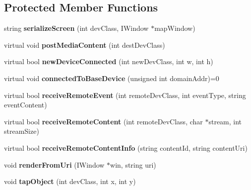 \subsection*{Protected Member Functions}
\begin{CompactItemize}
\item 
string \textbf{serializeScreen} (int devClass, IWindow $\ast$mapWindow)\label{classbr_1_1pucrio_1_1telemidia_1_1ginga_1_1ncl_1_1multidevice_1_1FormatterMultiDevice_f5e47dbd0c86806c7b1304fa042bfeb0}

\item 
virtual void \textbf{postMediaContent} (int destDevClass)\label{classbr_1_1pucrio_1_1telemidia_1_1ginga_1_1ncl_1_1multidevice_1_1FormatterMultiDevice_8125c94ad28c93f049b8cacdccc6d3c9}

\item 
virtual bool \textbf{newDeviceConnected} (int newDevClass, int w, int h)\label{classbr_1_1pucrio_1_1telemidia_1_1ginga_1_1ncl_1_1multidevice_1_1FormatterMultiDevice_fbbd269b1e949d8a04152b1e9106e1d7}

\item 
virtual void \textbf{connectedToBaseDevice} (unsigned int domainAddr)=0\label{classbr_1_1pucrio_1_1telemidia_1_1ginga_1_1ncl_1_1multidevice_1_1FormatterMultiDevice_3af5d97a0c56f9da9a45172453022837}

\item 
virtual bool \textbf{receiveRemoteEvent} (int remoteDevClass, int eventType, string eventContent)\label{classbr_1_1pucrio_1_1telemidia_1_1ginga_1_1ncl_1_1multidevice_1_1FormatterMultiDevice_7e36a7d304d1d9230060595a04a6e204}

\item 
virtual bool {\bf receiveRemoteContent} (int remoteDevClass, char $\ast$stream, int streamSize)\label{classbr_1_1pucrio_1_1telemidia_1_1ginga_1_1ncl_1_1multidevice_1_1FormatterMultiDevice_675bcb780d7b8e368c33df842b44cde5}

\item 
virtual bool {\bf receiveRemoteContentInfo} (string contentId, string contentUri)\label{classbr_1_1pucrio_1_1telemidia_1_1ginga_1_1ncl_1_1multidevice_1_1FormatterMultiDevice_c549328e7f2765e9eae9e4078e136b4d}

\item 
void \textbf{renderFromUri} (IWindow $\ast$win, string uri)\label{classbr_1_1pucrio_1_1telemidia_1_1ginga_1_1ncl_1_1multidevice_1_1FormatterMultiDevice_a6b10ebab13e696ada8cbef59ec5f560}

\item 
void \textbf{tapObject} (int devClass, int x, int y)\label{classbr_1_1pucrio_1_1telemidia_1_1ginga_1_1ncl_1_1multidevice_1_1FormatterMultiDevice_01fae01aec00c48236ef755575b0fa4d}


\end{CompactItemize}

